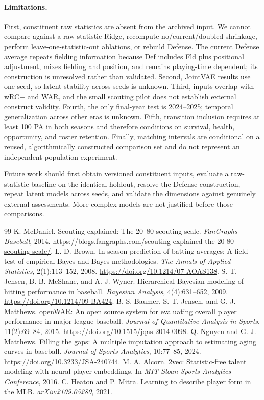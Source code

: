 \documentclass[10pt,twocolumn,letterpaper]{article}
\begin{document}
\paragraph{Limitations.}
First, constituent raw statistics are absent from the archived input. We cannot compare against a raw-statistic Ridge, recompute no/current/doubled shrinkage, perform leave-one-statistic-out ablations, or rebuild Defense. The current Defense average repeats fielding information because Def includes Fld plus positional adjustment, mixes fielding and position, and remains playing-time dependent; its construction is unresolved rather than validated. Second, JointVAE results use one seed, so latent stability across seeds is unknown. Third, inputs overlap with wRC+ and WAR, and the small scouting pilot does not establish external construct validity. Fourth, the only final-year test is 2024--2025; temporal generalization across other eras is unknown. Fifth, transition inclusion requires at least 100 PA in both seasons and therefore conditions on survival, health, opportunity, and roster retention. Finally, matching intervals are conditional on a reused, algorithmically constructed comparison set and do not represent an independent population experiment.

Future work should first obtain versioned constituent inputs, evaluate a raw-statistic baseline on the identical holdout, resolve the Defense construction, repeat latent models across seeds, and validate the dimensions against genuinely external assessments. More complex models are not justified before those comparisons.

\begin{thebibliography}{99}
 K. McDaniel. Scouting explained: The 20--80 scouting scale. \emph{FanGraphs Baseball}, 2014. \url{https://blogs.fangraphs.com/scouting-explained-the-20-80-scouting-scale/}.
 L. D. Brown. In-season prediction of batting averages: A field test of empirical Bayes and Bayes methodologies. \emph{The Annals of Applied Statistics}, 2(1):113--152, 2008. \url{https://doi.org/10.1214/07-AOAS138}.
 S. T. Jensen, B. B. McShane, and A. J. Wyner. Hierarchical Bayesian modeling of hitting performance in baseball. \emph{Bayesian Analysis}, 4(4):631--652, 2009. \url{https://doi.org/10.1214/09-BA424}.
 B. S. Baumer, S. T. Jensen, and G. J. Matthews. openWAR: An open source system for evaluating overall player performance in major league baseball. \emph{Journal of Quantitative Analysis in Sports}, 11(2):69--84, 2015. \url{https://doi.org/10.1515/jqas-2014-0098}.
 Q. Nguyen and G. J. Matthews. Filling the gaps: A multiple imputation approach to estimating aging curves in baseball. \emph{Journal of Sports Analytics}, 10:77--85, 2024. \url{https://doi.org/10.3233/JSA-240744}.
 M. A. Alcorn. 2vec: Statistic-free talent modeling with neural player embeddings. In \emph{MIT Sloan Sports Analytics Conference}, 2016.
 C. Heaton and P. Mitra. Learning to describe player form in the MLB. \emph{arXiv:2109.05280}, 2021.
\end{thebibliography}
\end{document}
